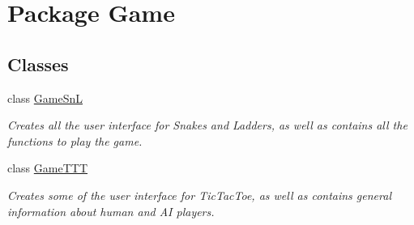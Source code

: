\hypertarget{namespace_game}{}\section{Package Game}
\label{namespace_game}
\subsection*{Classes}
\begin{DoxyCompactItemize}
\item 
class \hyperlink{class_game_1_1_game_sn_l}{Game\+Sn\+L}
\begin{DoxyCompactList}\small\item\em Creates all the user interface for Snakes and Ladders, as well as contains all the functions to play the game. \end{DoxyCompactList}\item 
class \hyperlink{class_game_1_1_game_t_t_t}{Game\+T\+T\+T}
\begin{DoxyCompactList}\small\item\em Creates some of the user interface for Tic\+Tac\+Toe, as well as contains general information about human and A\+I players. \end{DoxyCompactList}\end{DoxyCompactItemize}
